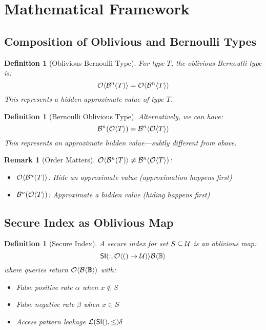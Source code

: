 \documentclass[11pt,final,hidelinks]{article}
\newcommand{\BernBool}{\mathcal{B}\langle \Bool \rangle}
\newcommand{\fprate}{\alpha}
\newcommand{\fnrate}{\beta}
\newtheorem{definition}[theorem]{Definition}
\newtheorem{remark}[theorem]{Remark}
\begin{document}
\section{Mathematical Framework}

\subsection{Composition of Oblivious and Bernoulli Types}

\begin{definition}[Oblivious Bernoulli Type]
For type $T$, the oblivious Bernoulli type is:
\begin{equation}
\Obv{\Bernoulli{T}{n}} = \Obv{\mathcal{B}^n\langle T \rangle}
\end{equation}
This represents a hidden approximate value of type $T$.
\end{definition}

\begin{definition}[Bernoulli Oblivious Type]
Alternatively, we can have:
\begin{equation}
\Bernoulli{\Obv{T}}{n} = \mathcal{B}^n\langle \Obv{T} \rangle
\end{equation}
This represents an approximate hidden value—subtly different from above.
\end{definition}

\begin{remark}[Order Matters]
$\Obv{\Bernoulli{T}{n}} \neq \Bernoulli{\Obv{T}}{n}$:
\begin{itemize}
    \item $\Obv{\Bernoulli{T}{n}}$: Hide an approximate value (approximation happens first)
    \item $\Bernoulli{\Obv{T}}{n}$: Approximate a hidden value (hiding happens first)
\end{itemize}
\end{remark}

\subsection{Secure Index as Oblivious Map}

\begin{definition}[Secure Index]
A secure index for set $S \subseteq \Universe$ is an oblivious map:
\begin{equation}
\SI: \ObvMap{\Universe}{\BernBool}
\end{equation}
where queries return $\Obv{\BernBool}$ with:
\begin{itemize}
    \item False positive rate $\fprate$ when $x \notin S$
    \item False negative rate $\fnrate$ when $x \in S$
    \item Access pattern leakage $\Leak{\SI} \leq \delta$
\end{itemize}
\end{definition}
\end{document}
